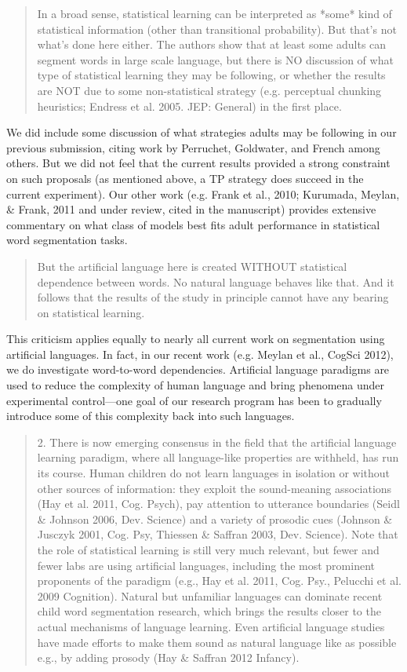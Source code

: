 \documentclass[12pt]{letter}
\begin{document}
\begin{quote}
In a broad sense, statistical learning can be interpreted as *some* kind of statistical information (other than transitional probability). But that's not what's done here either. The authors show that at least some adults can segment words in large scale language, but there is NO discussion of what type of statistical learning they may be following, or whether the results are NOT due to some non-statistical strategy (e.g. perceptual chunking heuristics; Endress et al. 2005. JEP: General) in the first place.
\end{quote}

We did include some discussion of what strategies adults may be following in our previous submission, citing work by Perruchet, Goldwater, and French among others. But we did not feel that the current results provided a strong constraint on such proposals (as mentioned above, a TP strategy does succeed in the current experiment). Our other work (e.g. Frank et al., 2010; Kurumada, Meylan, \& Frank, 2011 and under review, cited in the manuscript) provides extensive commentary on what class of models best fits adult performance in statistical word segmentation tasks.

\begin{quote}
But the artificial language here is created WITHOUT statistical dependence between words. No natural language behaves like that. And it follows that the results of the study in principle cannot have any bearing on statistical learning.
\end{quote}

This criticism applies equally to nearly all current work on segmentation using artificial languages. In fact, in our recent work (e.g. Meylan et al., CogSci 2012), we do investigate word-to-word dependencies. Artificial language paradigms are used to reduce the complexity of human language and bring phenomena under experimental control---one goal of our research program has been to gradually introduce some of this complexity back into such languages.

\begin{quote}
2. There is now emerging consensus in the field that the artificial language learning paradigm, where all language-like properties are withheld, has run its course. Human children do not learn languages in isolation or without other sources of information: they exploit the sound-meaning associations (Hay et al. 2011, Cog. Psych), pay attention to utterance boundaries (Seidl \& Johnson 2006, Dev. Science) and a variety of prosodic cues (Johnson \& Jusczyk 2001, Cog. Psy, Thiessen \& Saffran 2003, Dev. Science). Note that the role of statistical learning is still very much relevant, but fewer and fewer labs are using artificial languages, including the most prominent proponents of the paradigm (e.g., Hay et al. 2011, Cog. Psy., Pelucchi et al. 2009 Cognition). Natural but unfamiliar languages can dominate recent child word segmentation research, which brings the results closer to the actual mechanisms of language learning. Even artificial language studies have made efforts to make them sound as natural language like as possible e.g., by adding prosody (Hay \& Saffran 2012 Infancy).
\end{quote}
\end{document}
